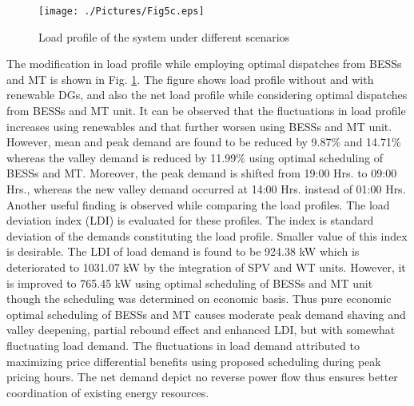 \documentclass[journal]{IEEEtran}
\begin{document}
%
   \begin{figure}[!ht]
  	\centering
  	\texttt{[image: ./Pictures/Fig5c.eps]}
  	\vspace{-0.2cm}
  	\caption{Load profile of the system under different scenarios\label{Fig:7}} 
  	\vspace{-0.6cm}
  \end{figure} 
 \par The modification in load profile while employing optimal dispatches from BESSs and MT is shown in Fig. \ref{Fig:7}. The figure shows load profile without and with renewable DGs, and also the net load profile while considering optimal dispatches from BESSs and MT unit. It can be observed that the fluctuations in load profile increases using renewables and that further worsen using BESSs and MT unit. However, mean and peak demand are found to be reduced by 9.87$\%$ and 14.71$\%$ whereas the valley demand is reduced by 11.99$\%$ using optimal scheduling of BESSs and MT. Moreover, the peak demand is shifted from 19:00 Hrs. to 09:00 Hrs., whereas the new valley demand occurred at 14:00 Hrs. instead of 01:00 Hrs. Another useful finding is observed while comparing the load profiles. The load deviation index (LDI) is evaluated for these profiles. The index is standard deviation of the demands constituting the load profile. Smaller value of this index is desirable. The LDI of load demand is found to be 924.38 kW which is deteriorated to 1031.07 kW by the integration of SPV and WT units. However, it is improved to 765.45 kW using optimal scheduling of BESSs and MT unit though the scheduling was determined on economic basis. Thus pure economic optimal scheduling of BESSs and MT causes moderate peak demand shaving and valley deepening, partial rebound effect and enhanced LDI, but with somewhat fluctuating load demand. The fluctuations in load demand attributed to maximizing price differential benefits using proposed scheduling during peak pricing hours. The net demand depict no reverse power flow thus ensures better coordination of existing energy resources.
%
\end{document}
